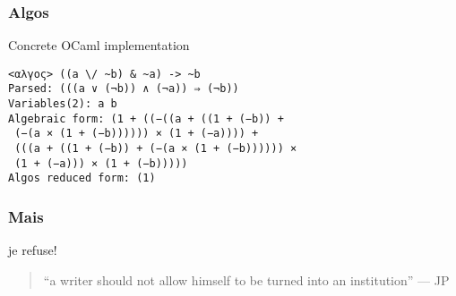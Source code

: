 \documentclass{beamer}
\begin{document}
\begin{frame}
\frametitle{}
\begin{block}
{}

\end{block}
\end{frame}

\begin{frame}
\frametitle{}
\begin{block}
{}

\end{block}
\end{frame}

\begin{frame}
\frametitle{}
\begin{block}
{}

\end{block}
\end{frame}

\begin{frame}
\frametitle{}
\begin{block}
{}

\end{block}
\end{frame}

\begin{frame}[fragile]
\frametitle{Algos}
\begin{block}
{Concrete OCaml implementation}


\begin{center}
\begin{verbatim}
<αλγος> ((a \/ ~b) & ~a) -> ~b
Parsed: (((a ∨ (¬b)) ∧ (¬a)) ⇒ (¬b))
Variables(2): a b
Algebraic form: (1 + ((−((a + ((1 + (−b)) +
 (−(a × (1 + (−b)))))) × (1 + (−a)))) +
 (((a + ((1 + (−b)) + (−(a × (1 + (−b)))))) ×
 (1 + (−a))) × (1 + (−b)))))
Algos reduced form: (1)
\end{verbatim}
\end{center}


\end{block}
\end{frame}



\begin{frame}
\frametitle{Mais}
\begin{block}
{je refuse!} 


\begin{quote}
``a writer should not allow himself to be turned into an institution'' --- \textsc{JP}
\end{quote}


\end{block}
\end{frame}

%
%
\end{document}
